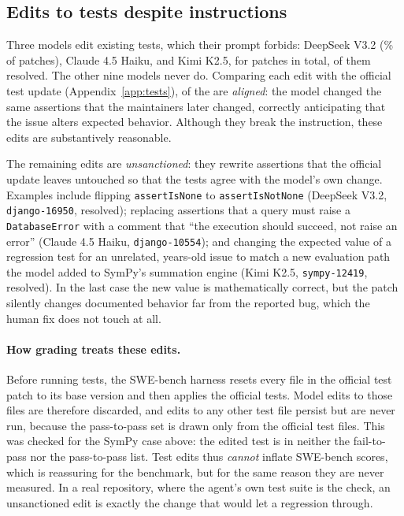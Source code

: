 \documentclass[10pt]{article}
\begin{document}
\subsection{Edits to tests despite instructions}\label{sec:tests}

Three models edit existing tests, which their prompt forbids: DeepSeek V3.2 (\ModelEditTestsMaxPct\% of patches), Claude 4.5 Haiku, and Kimi K2.5, for \NTestEdits{} patches in total, \NTestEditsResolved{} of them resolved. The other nine models never do. Comparing each edit with the official test update (Appendix~\ref{app:tests}), \NTestEditsAligned{} of the \NTestEdits{} are \emph{aligned}: the model changed the same assertions that the maintainers later changed, correctly anticipating that the issue alters expected behavior. Although they break the instruction, these edits are substantively reasonable.

The remaining \NTestEditsUnsanctioned{} edits are \emph{unsanctioned}: they rewrite assertions that the official update leaves untouched so that the tests agree with the model's own change. Examples include flipping \texttt{assertIsNone} to \texttt{assertIsNotNone} (DeepSeek V3.2, \texttt{django-16950}, resolved); replacing assertions that a query must raise a \texttt{DatabaseError} with a comment that ``the execution should succeed, not raise an error'' (Claude 4.5 Haiku, \texttt{django-10554}); and changing the expected value of a regression test for an unrelated, years-old issue to match a new evaluation path the model added to SymPy's summation engine (Kimi K2.5, \texttt{sympy-12419}, resolved). In the last case the new value is mathematically correct, but the patch silently changes documented behavior far from the reported bug, which the human fix does not touch at all.

\paragraph{How grading treats these edits.} Before running tests, the SWE-bench harness resets every file in the official test patch to its base version and then applies the official tests. Model edits to those files are therefore discarded, and edits to any other test file persist but are never run, because the pass-to-pass set is drawn only from the official test files. This was checked for the SymPy case above: the edited test is in neither the fail-to-pass nor the pass-to-pass list. Test edits thus \emph{cannot} inflate SWE-bench scores, which is reassuring for the benchmark, but for the same reason they are never measured. In a real repository, where the agent's own test suite is the check, an unsanctioned edit is exactly the change that would let a regression through.
\end{document}
